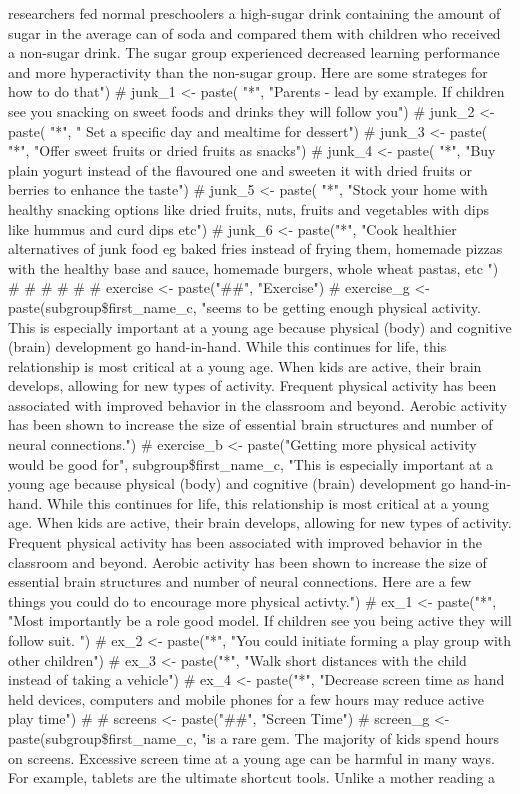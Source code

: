 \documentclass[]{article}
\begin{document}
researchers fed normal preschoolers a high-sugar drink containing the amount of sugar in the average can of soda and compared them with children who received a non-sugar drink. The sugar group experienced decreased learning performance and more hyperactivity than the non-sugar group. Here are some strateges for how to do that") \# junk\_1 \textless{}- paste( "*", "Parents - lead by example. If children see you snacking on sweet foods and drinks they will follow you") \# junk\_2 \textless{}- paste( "*", " Set a specific day and mealtime for dessert") \# junk\_3 \textless{}- paste( "*", "Offer sweet fruits or dried fruits as snacks") \# junk\_4 \textless{}- paste( "*", "Buy plain yogurt instead of the flavoured one and sweeten it with dried fruits or berries to enhance the taste") \# junk\_5 \textless{}- paste( "*", "Stock your home with healthy snacking options like dried fruits, nuts, fruits and vegetables with dips like hummus and curd dips etc") \# junk\_6 \textless{}- paste("*", "Cook healthier alternatives of junk food eg baked fries instead of frying them, homemade pizzas with the healthy base and sauce, homemade burgers, whole wheat pastas, etc ") \#  \#  \#  \#  \#  \# exercise \textless{}- paste("\#\#", "Exercise") \# exercise\_g \textless{}- paste(subgroup\$first\_name\_c, "seems to be getting enough physical activity. This is especially important at a young age because physical (body) and cognitive (brain) development go hand-in-hand. While this continues for life, this relationship is most critical at a young age. When kids are active, their brain develops, allowing for new types of activity. Frequent physical activity has been associated with improved behavior in the classroom and beyond. Aerobic activity has been shown to increase the size of essential brain structures and number of neural connections.") \# exercise\_b \textless{}- paste("Getting more  physical activity would be good for", subgroup\$first\_name\_c, "This is especially important at a young age because physical (body) and cognitive (brain) development go hand-in-hand. While this continues for life, this relationship is most critical at a young age. When kids are active, their brain develops, allowing for new types of activity. Frequent physical activity has been associated with improved behavior in the classroom and beyond. Aerobic activity has been shown to increase the size of essential brain structures and number of neural connections. Here are a few things you could do to encourage more physical activty.") \# ex\_1 \textless{}- paste("*", "Most importantly be a role good model. If children see you being active they will follow suit. ") \# ex\_2 \textless{}- paste("*", "You could initiate forming a play group with other children") \# ex\_3 \textless{}- paste("*", "Walk short distances with the child instead of taking a vehicle") \# ex\_4 \textless{}- paste("*", "Decrease screen time as hand held devices, computers and mobile phones for a few hours may reduce active play time") \#  \# screens \textless{}- paste("\#\#", "Screen Time") \# screen\_g \textless{}- paste(subgroup\$first\_name\_c, "is a rare gem. The majority of kids spend hours on screens. Excessive screen time at a young age can be harmful in many ways. For example, tablets are the ultimate shortcut tools. Unlike a mother reading a 
\end{document}
